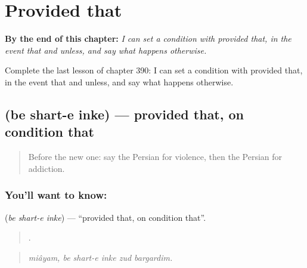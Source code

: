 
\chapter{Provided that}
\label{ch:fa-provided-that}

\begin{chapteropening}
\textbf{By the end of this chapter:} \emph{I can set a condition with provided that, in the event that and unless, and say what happens otherwise.}

Complete the last lesson of chapter 390: I can set a condition with provided that, in the event that and unless, and say what happens otherwise.
\end{chapteropening}

\section[\texorpdfstring{\fa{به} \fa{شرط} \fa{اینکه} (be shart-e inke)}{به شرط اینکه (be shart-e inke)}]{   (be shart-e inke) — provided that, on condition that}

\label{lesson:FA-C390-be-shart-e-inke}



\begin{quote}
Before the new one: say the Persian for violence, then the Persian for addiction.
\end{quote}

\subsection*{You'll want to know:   }
\textbf{  } (\emph{be shart-e inke}) — \textquotedblleft{}provided that, on condition that\textquotedblright{}.

\begin{quote}
     .
\end{quote}

\begin{quote}
\emph{miâyam, be shart-e inke zud bargardim.}
\end{quote}

